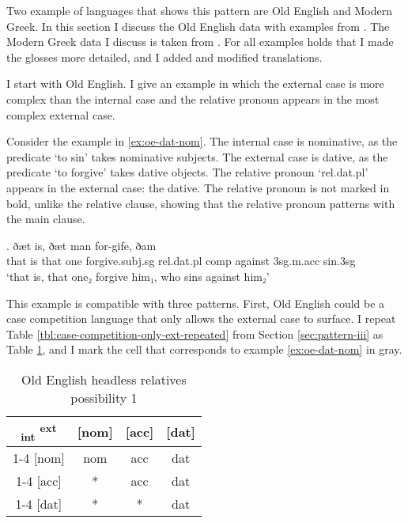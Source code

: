Two example of languages that shows this pattern are Old English and Modern Greek. In this section I discuss the Old English data with examples from \citet{harbert1983}. The Modern Greek data I discuss is taken from \citet{daskalaki2011}. For all examples holds that I made the glosses more detailed, and I added and modified translations.

I start with Old English. I give an example in which the external case is more complex than the internal case and the relative pronoun appears in the most complex external case.

Consider the example in \ref{ex:oe-dat-nom}.
The internal case is nominative, as the predicate  `to sin' takes nominative subjects.
The external case is dative, as the predicate  `to forgive' takes dative objects.
The relative pronoun  `\ac{rel}.\ac{dat}.\ac{pl}' appears in the external case: the dative. The relative pronoun is not marked in bold, unlike the relative clause, showing that the relative pronoun patterns with the main clause.

\exg. ðæt is, ðæt man for-gife, ðam    \\
 that is that one forgive.\ac{subj}.\ac{sg}\scsub{[dat]} \ac{rel}.\ac{dat}.\ac{pl} \ac{comp} against 3\ac{sg}.\ac{m}.\ac{acc} sin.3\ac{sg}\scsub{[nom]}\\
 `that is, that one₂ forgive him₁, who sins against him₂'  \label{ex:oe-dat-nom}

This example is compatible with three patterns. First, Old English could be a case competition language that only allows the external case to surface. I repeat Table \ref{tbl:case-competition-only-ext-repeated} from Section \ref{sec:pattern-iii} as Table \ref{tbl:oe-poss1}, and I mark the cell that corresponds to example \ref{ex:oe-dat-nom} in gray.

 \begin{table}[H]
   \center
   \caption{Old English headless relatives possibility 1}
   \begin{tabular}{c|c|c|c}
     \toprule
     \textsubscript{\ac{int}} \textsuperscript{\ac{ext}}
            & [\ac{nom}]
            & [\ac{acc}]
            & [\ac{dat}]
            \\ \cmidrule{1-4}
        [\ac{nom}]
            & \ac{nom}
            & \ac{acc}
            & \cellcolor{LG}\ac{dat}
            \\ \cmidrule{1-4}
        [\ac{acc}]
            & *
            & \ac{acc}
            & \ac{dat}
            \\ \cmidrule{1-4}
        [\ac{dat}]
            & *
            & *
            & \ac{dat}
            \\
      \bottomrule
   \end{tabular}
     \label{tbl:oe-poss1}
 \end{table}


